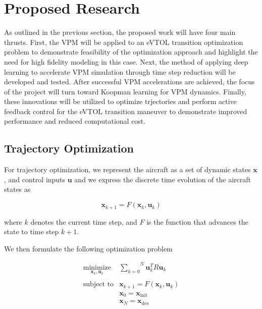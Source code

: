 \documentclass[12pt, letterpaper]{article}
\begin{document}


\section{Proposed Research}



As outlined in the previous section, the proposed work will have four main thrusts.  First, the VPM will be applied to an eVTOL transition optimization problem to demonstrate feasibility of the optimization approach and highlight the need for high fidelity modeling in this case.  Next, the method of applying deep learning to accelerate VPM simulation through time step reduction will be developed and tested.  After successful VPM accelerations are achieved, the focus of the project will turn toward Koopman learning for VPM dynamics.  Finally, these innovations will be utilized to optimize trjectories and perform active feedback control for the eVTOL transition maneuver to demonstrate improved performance and reduced computational cost.  

\subsection{Trajectory Optimization}

For trajectory optimization, we represent the aircraft as a set of dynamic states $\mathbf{x}$, and control inputs $\mathbf{u}$ and we express the discrete time evolution of the aircraft states as

\begin{equation}
    \mathbf{x}_{k+1} = F(\mathbf{x}_k, \mathbf{u}_k)
\end{equation}

where $k$ denotes the current time step, and $F$ is the function that advances the state to time step $k+1$.

We then formulate the following optimization problem

\begin{equation}
    \begin{matrix}
        \underset{\mathbf{x}_k, \mathbf{u}_k}{\text{minimize}} & \overset{N}{\underset{k=0}{\sum}} \mathbf{u}_k^T R \mathbf{u}_k \\ \\ 
        \text{subject to} & \mathbf{x}_{k+1} = F(\mathbf{x}_k, \mathbf{u}_k) \\
        & \mathbf{x}_0 = \mathbf{x}_{\text{init}} \\ 
        & \mathbf{x}_N = \mathbf{x}_{\text{des}}
    \end{matrix}
\end{equation}
\end{document}

